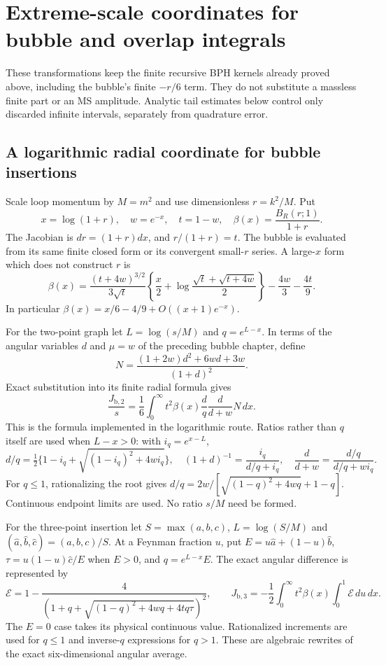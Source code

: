 \section{Extreme-scale coordinates for bubble and overlap integrals}

These transformations keep the finite recursive BPH kernels already proved
above, including the bubble's finite $-r/6$ term. They do not substitute a
massless finite part or an MS amplitude. Analytic tail estimates below
control only discarded infinite intervals, separately from quadrature error.

\subsection{A logarithmic radial coordinate for bubble insertions}

Scale loop momentum by $M=m^2$ and use dimensionless $r=k^2/M$. Put
\[
 x=\log(1+r),\quad w=e^{-x},\quad t=1-w,\quad
 \beta(x)=\frac{B_R(r;1)}{1+r}.
\]
The Jacobian is $dr=(1+r)dx$, and $r/(1+r)=t$. The bubble is evaluated
from its same finite closed form or its convergent small-$r$ series. A
large-$x$ form which does not construct $r$ is
\[
 \beta(x)=\frac{(t+4w)^{3/2}}{3\sqrt t}
 \left\{\frac x2+\log\frac{\sqrt t+\sqrt{t+4w}}2\right\}
                  -\frac{4w}{3}-\frac{4t}{9}.
\]
In particular $\beta(x)=x/6-4/9+O((x+1)e^{-x})$.

For the two-point graph let $L=\log(s/M)$ and $q=e^{L-x}$. In terms of
the angular variables $d$ and $\mu=w$ of the preceding bubble chapter,
define
\[
 N=\frac{(1+2w)d^2+6wd+3w}{(1+d)^2}.
\]
Exact substitution into its finite radial formula gives
\[
 \frac{J_{\mathrm{b},2}}s
 =\frac16\int_0^\infty t^2\beta(x)
                  \frac dq\frac{d}{d+w}N\,dx.
\]
This is the formula implemented in the logarithmic route. Ratios rather
than $q$ itself are used when $L-x>0$: with $i_q=e^{x-L}$,
\[
 d/q=\tfrac12\{1-i_q+\sqrt{(1-i_q)^2+4wi_q}\},\quad
 (1+d)^{-1}=\frac{i_q}{d/q+i_q},\quad
 \frac{d}{d+w}=\frac{d/q}{d/q+wi_q}.
\]
For $q\le1$, rationalizing the root gives
$d/q=2w/[\sqrt{(1-q)^2+4wq}+1-q]$. Continuous endpoint limits are used.
No ratio $s/M$ need be formed.

For the three-point insertion let $S=\max(a,b,c)$, $L=\log(S/M)$ and
$(\widehat a,\widehat b,\widehat c)=(a,b,c)/S$. At a Feynman fraction
$u$, put $E=u\widehat a+(1-u)\widehat b$,
$\tau=u(1-u)\widehat c/E$ when $E>0$, and $q=e^{L-x}E$. The exact
angular difference is represented by
\[
 \mathcal E=1-\frac4{(1+q+\sqrt{(1-q)^2+4wq+4tq\tau})^2},\qquad
 J_{\mathrm{b},3}=-\frac12\int_0^\infty t^2\beta(x)
                                \int_0^1\mathcal E\,du\,dx.
\]
The $E=0$ case takes its physical continuous value. Rationalized increments
are used for $q\le1$ and inverse-$q$ expressions for $q>1$. These are
algebraic rewrites of the exact six-dimensional angular average.

